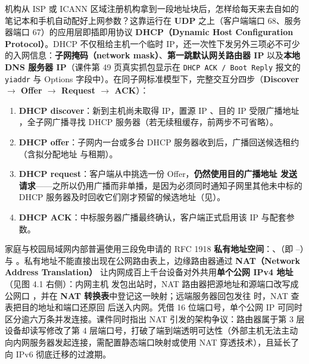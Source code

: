 
机构从 ISP 或 ICANN 区域注册机构拿到一段地址块后，怎样给每天来去自如的笔记本和手机自动配好上网参数？这靠运行在 \textbf{UDP} 之上（客户端端口 68、服务器端口 67）的应用层即插即用协议 \textbf{DHCP（Dynamic Host Configuration Protocol）}。DHCP 不仅租给主机一个临时 IP，还一次性下发另外三项必不可少的入网信息：\textbf{子网掩码（network mask）}、\textbf{第一跳默认网关路由器 IP} 以及\textbf{本地 DNS 服务器 IP}（课件第 49 页真实抓包显示在 \texttt{DHCP ACK / Boot Reply} 报文的 \texttt{yiaddr} 与 Options 字段中）。在同子网标准模型下，完整交互分四步（\textbf{Discover $\to$ Offer $\to$ Request $\to$ ACK}）：
\begin{enumerate}
\item \textbf{DHCP discover}：新到主机尚未取得 IP，置源 IP 、目的 IP 受限广播地址 ，全子网广播寻找 DHCP 服务器（若无续租缓存，前两步不可省略）。
\item \textbf{DHCP offer}：子网内一台或多台 DHCP 服务器收到后，广播回送候选租约（含拟分配地址  与租期）。
\item \textbf{DHCP request}：客户端从中挑选一份 Offer，\textbf{仍然使用目的广播地址  发送请求}——之所以仍用广播而非单播，是因为必须同时通知子网里其他未中标的 DHCP 服务器及时回收它们刚才预留的候选地址（见）。
\item \textbf{DHCP ACK}：中标服务器广播最终确认，客户端正式启用该 IP 与配套参数。
\end{enumerate}

家庭与校园局域网内部普遍使用三段免申请的 RFC 1918 \textbf{私有地址空间}：、（即 –）与 。私有地址不能直接出现在公网路由表上，边缘路由器通过 \textbf{NAT（Network Address Translation）} 让内网成百上千台设备对外共用\textbf{单个公网 IPv4 地址}（见图 4.1 右侧）：内网主机  发包出站时，NAT 路由器把源地址和源端口改写成公网口 ，并在 \textbf{NAT 转换表}中登记这一映射；远端服务器回包发往  时，NAT 查表把目的地址和端口还原回  后送入内网。凭借 16 位端口号，单个公网 IP 可同时区分逾六万条并发连接。课件同时指出 NAT 引发的架构争议：路由器属于第 3 层设备却读写修改了第 4 层端口号，打破了端到端透明可达性（外部主机无法主动向内网服务器发起连接，需配置静态端口映射或使用 NAT 穿透技术），且延长了向 IPv6 彻底迁移的过渡期。


